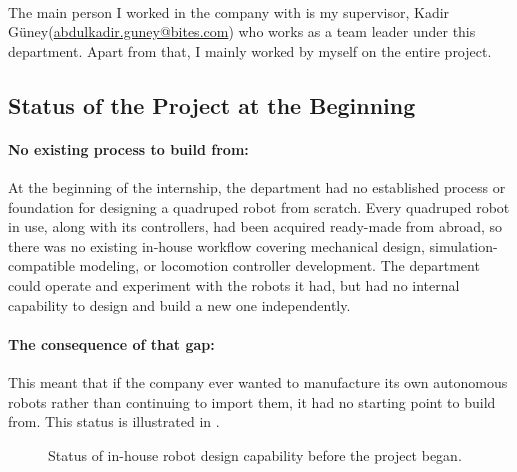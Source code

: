 \documentclass[12pt]{article}
\newcommand{\rptSupervisor}{Kadir G\"uney}
\begin{document}
\paragraph{}The main person I worked in the company with is my supervisor, \rptSupervisor (\url{abdulkadir.guney@bites.com}) who works as a  team leader under this department. Apart from that, I mainly worked by myself on the entire project.

\subsection{Status of the Project at the Beginning}
\label{subsec:status-beginning}
\paragraph{No existing process to build from:} At the beginning of the internship, the department had no established process or foundation for designing a quadruped robot from scratch. Every quadruped robot in use, along with its controllers, had been acquired ready-made from abroad, so there was no existing in-house workflow covering mechanical design, simulation-compatible modeling, or locomotion controller development. The department could operate and experiment with the robots it had, but had no internal capability to design and build a new one independently.
\paragraph{The consequence of that gap:} This meant that if the company ever wanted to manufacture its own autonomous robots rather than continuing to import them, it had no starting point to build from. This status is illustrated in .

\begin{figure}[H]
\centering
{}
\caption{Status of in-house robot design capability before the project began.}
\label{fig:status_beginning}
\end{figure}
\end{document}
